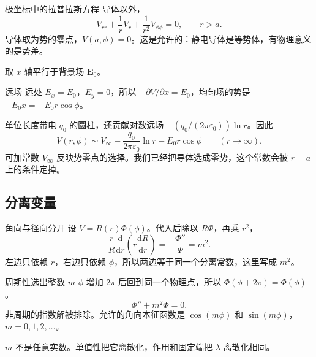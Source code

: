 \documentclass[fontset=windows, chinese, 10pt, xcolor=dvipsnames]{beamer}
\begin{document}
\begin{frame}{极坐标中的拉普拉斯方程}
  导体以外，
  \begin{equation*}
    V_{rr}+\frac{1}{r}V_r+\frac{1}{r^2}V_{\phi\phi}=0,
    \qquad r>a.
  \end{equation*}
  导体取为势的零点，$V(a,\phi)=0$。这是允许的：静电导体是等势体，有物理意义的是势差。
  \vspace{0.3em}

  取 $x$ 轴平行于背景场 $\mathbf{E}_0$。
\end{frame}

\begin{frame}{远场}
  远处 $E_x=E_0$，$E_y=0$，所以 $-\partial V/\partial x=E_0$，均匀场的势是 $-E_0 x=-E_0 r\cos\phi$。
  \vspace{0.3em}

  单位长度带电 $q_0$ 的圆柱，还贡献对数远场 $-(q_0/(2\pi\varepsilon_0))\ln r$。因此
  \begin{equation*}
    V(r,\phi)\sim
    V_{\infty}-\frac{q_0}{2\pi\varepsilon_0}\ln r-E_0 r\cos\phi
    \qquad (r\to\infty).
  \end{equation*}
  可加常数 $V_{\infty}$ 反映势零点的选择。我们已经把导体选成零势，这个常数会被 $r=a$ 上的条件定掉。
\end{frame}

\subsection{分离变量}

\begin{frame}{角向与径向分开}
  设 $V=R(r)\Phi(\phi)$。代入后除以 $R\Phi$，再乘 $r^2$，
  \begin{equation*}
    \frac{r}{R}\frac{\mathrm{d}}{\mathrm{d}r}
      \left(r\frac{\mathrm{d}R}{\mathrm{d}r}\right)
    =-\frac{\Phi''}{\Phi}=m^2.
  \end{equation*}
  左边只依赖 $r$，右边只依赖 $\phi$，所以两边等于同一个分离常数，这里写成 $m^2$。
\end{frame}

\begin{frame}{周期性选出整数 $m$}
  $\phi$ 增加 $2\pi$ 后回到同一个物理点，所以 $\Phi(\phi+2\pi)=\Phi(\phi)$。
  \begin{equation*}
    \Phi''+m^2\Phi=0.
  \end{equation*}
  非周期的指数解被排除。允许的角向本征函数是 $\cos(m\phi)$ 和 $\sin(m\phi)$，$m=0,1,2,\ldots$。
  \vspace{0.3em}

  $m$ 不是任意实数。单值性把它离散化，作用和固定端把 $\lambda$ 离散化相同。
\end{frame}
\end{document}
